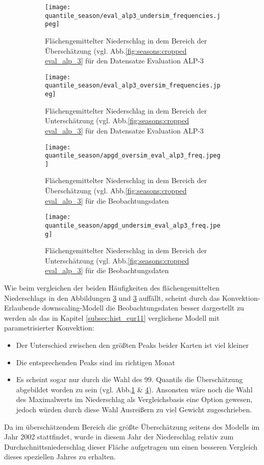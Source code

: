 \begin{figure}[h]
	\begin{subfigure}{0.49\textwidth}
		\texttt{[image: quantile\_season/eval\_alp3\_undersim\_frequencies.jpeg]}
		\caption{Flächengemittelter Niederschlag in dem Bereich der Überschätzung (vgl. Abb.\ref{fig:seasons:cropped eval_alp_3} für den Datensatze Evaluation ALP-3}
		\label{fig:seasons:oversim eval_alp_3}
	\end{subfigure}
	\begin{subfigure}{0.49\textwidth}
		\texttt{[image: quantile\_season/eval\_alp3\_oversim\_frequencies.jpeg]}
		\caption{Flächengemittelter Niederschlag in dem Bereich der Unterschätzung (vgl. Abb.\ref{fig:seasons:cropped eval_alp_3} für den Datensatze Evaluation ALP-3}
		\label{fig:seasons:undersim_eval_alp_3}
	\end{subfigure}
	\caption{}
	\label{fig:seasons:overunder_eval_alp3}
\end{figure}
\begin{figure}[h]
	\begin{subfigure}{0.49\textwidth}
		\texttt{[image: quantile\_season/apgd\_oversim\_eval\_alp3\_freq.jpeg]}
		\caption{Flächengemittelter Niederschlag in dem Bereich der Überschätzung (vgl. Abb.\ref{fig:seasons:cropped eval_alp_3} für die Beobachtungsdaten}
		\label{fig:seasons:oversim eval_alp_3_obs}
	\end{subfigure}
	\begin{subfigure}{0.49\textwidth}
		\texttt{[image: quantile\_season/apgd\_undersim\_eval\_alp3\_freq.jpeg]}
		\caption{Flächengemittelter Niederschlag in dem Bereich der Unterschätzung (vgl. Abb.\ref{fig:seasons:cropped eval_alp_3} für die Beobachtungsdaten}
		\label{fig:seasons:undersim_eval_alp_3_obs}
	\end{subfigure}
	\caption{}
	\label{fig:seasons:overunder_obs_eval_alp3}
\end{figure}
Wie beim vergleichen der beiden Häufigkeiten des flächengemittelten Niederschlags in den Abbildungen \ref{fig:seasons:overunder_eval_alp3} und \ref{fig:seasons:overunder_eval_alp3} auffällt, scheint durch das Konvektion-Erlaubende downscaling-Modell die Beobachtungsdaten besser dargestellt zu werden als das in Kapitel \ref{subsec:hist_eur11} verglichene Modell mit parametrisierter Konvektion:
\begin{itemize}
	\item Der Unterschied zwischen den größten Peaks beider Karten ist viel kleiner
	\item Die entsprechenden Peaks sind im richtigen Monat
	\item Es scheint sogar nur durch die Wahl des 99. Quantils die Überschätzung abgebildet worden zu sein (vgl. Abb.\ref{fig:seasons:oversim eval_alp_3} \& \ref{fig:seasons:oversim eval_alp_3_obs}). Ansonsten wäre noch die Wahl des Maximalwerts im Niederschlag als Vergleichsbasis eine Option gewesen, jedoch würden durch diese Wahl Ausreißern zu viel Gewicht zugeschrieben.
\end{itemize}
Da im überschätzendem Bereich die größte Überschätzung seitens des Modells im Jahr 2002 stattfindet, wurde in diesem Jahr der Niederschlag relativ zum Durchschnittsniederschlag dieser Fläche aufgetragen um einen besseren Vergleich dieses speziellen Jahres zu erhalten.